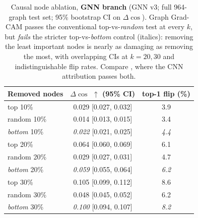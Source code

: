 \documentclass[11pt]{article}
\begin{document}
\begin{table}[t]
  \centering
  \caption{Causal node ablation, \textbf{GNN branch} (GNN v3; full 964-graph test set; 95\% bootstrap CI on $\Delta\cos$). Graph Grad-CAM passes the conventional top-vs-\emph{random} test at every $k$, but \emph{fails} the stricter top-vs-\emph{bottom} control (italics): removing the least important nodes is nearly as damaging as removing the most, with overlapping CIs at $k{=}20,30$ and indistinguishable flip rates. Compare , where the CNN attribution passes both.}
  \label{tab:ablation}
  \small
  \begin{tabular}{lcc}
    \toprule
    Removed nodes & $\Delta\cos$ $\uparrow$ (95\% CI) & top-1 flip (\%) \\
    \midrule
    top 10\%    & 0.029 [0.027, 0.032] & 3.9 \\
    random 10\% & 0.014 [0.013, 0.015] & 3.4 \\
    \emph{bottom} 10\% & \emph{0.022} [0.021, 0.025] & \emph{4.4} \\
    \midrule
    top 20\%    & 0.064 [0.060, 0.069] & 6.1 \\
    random 20\% & 0.029 [0.027, 0.031] & 4.7 \\
    \emph{bottom} 20\% & \emph{0.059} [0.055, 0.064] & \emph{6.2} \\
    \midrule
    top 30\%    & 0.105 [0.099, 0.112] & 8.6 \\
    random 30\% & 0.048 [0.045, 0.052] & 6.2 \\
    \emph{bottom} 30\% & \emph{0.100} [0.094, 0.107] & \emph{8.2} \\
    \bottomrule
  \end{tabular}
\end{table}
\end{document}
